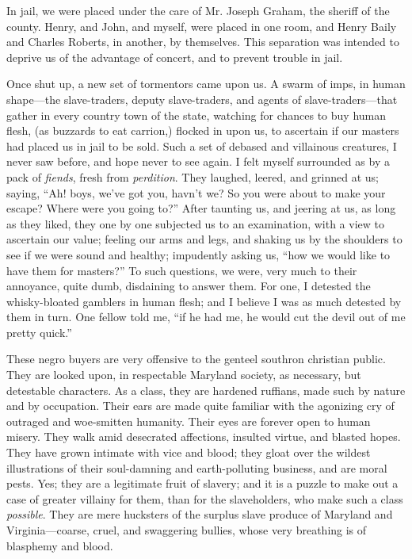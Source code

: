 In jail, we were placed under the care of Mr. Joseph Graham, the sheriff
of the county. Henry, and John, and myself, were placed in one room, and
Henry Baily and Charles Roberts, in another, by themselves. This
separation was intended to deprive us of the advantage of concert, and
to prevent trouble in jail.

Once shut up, a new set of tormentors came upon us. A swarm of imps, in
human shape---the slave-traders, deputy slave-traders, and agents of
slave-traders---that gather in every country town of the state, watching
for chances to buy human flesh, (as buzzards to eat carrion,) flocked in
upon us, to ascertain if our masters had placed us in jail to be sold.
Such a set of debased and villainous creatures, I never saw before, and
hope never to see again. I felt myself surrounded as by a pack of
\emph{fiends}, fresh from \emph{perdition}. They laughed, leered, and
grinned at us; saying, ``Ah! boys, we've got you, havn't we? So you were
about to make your escape? Where were you going to?'' After taunting us,
and jeering at us, {}as long as they liked, they one by one subjected us
to an examination, with a view to ascertain our value; feeling our arms
and legs, and shaking us by the shoulders to see if we were sound and
healthy; impudently asking us, ``how we would like to have them for
masters?'' To such questions, we were, very much to their annoyance,
quite dumb, disdaining to answer them. For one, I detested the
whisky-bloated gamblers in human flesh; and I believe I was as much
detested by them in turn. One fellow told me, ``if he had me, he would
cut the devil out of me pretty quick.''

These negro buyers are very offensive to the genteel southron christian
public. They are looked upon, in respectable Maryland society, as
necessary, but detestable characters. As a class, they are hardened
ruffians, made such by nature and by occupation. Their ears are made
quite familiar with the agonizing cry of outraged and woe-smitten
humanity. Their eyes are forever open to human misery. They walk amid
desecrated affections, insulted virtue, and blasted hopes. They have
grown intimate with vice and blood; they gloat over the wildest
illustrations of their soul-damning and earth-polluting business, and
are moral pests. Yes; they are a legitimate fruit of slavery; and it is
a puzzle to make out a case of greater villainy for them, than for the
slaveholders, who make such a class \emph{possible}. They are mere
hucksters of the surplus slave produce of Maryland and
Virginia---coarse, cruel, and swaggering bullies, whose very breathing
is of blasphemy and blood.


